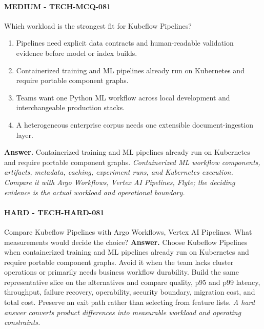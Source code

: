 \paragraph{MEDIUM - TECH-MCQ-081} Which workload is the strongest fit for Kubeflow Pipelines?
\begin{enumerate}[label=\Alph*.]
\item Pipelines need explicit data contracts and human-readable validation evidence before model or index builds.
\item Containerized training and ML pipelines already run on Kubernetes and require portable component graphs.
\item Teams want one Python ML workflow across local development and interchangeable production stacks.
\item A heterogeneous enterprise corpus needs one extensible document-ingestion layer.
\end{enumerate}
\textbf{Answer.} Containerized training and ML pipelines already run on Kubernetes and require portable component graphs.
\textit{Containerized ML workflow components, artifacts, metadata, caching, experiment runs, and Kubernetes execution. Compare it with Argo Workflows, Vertex AI Pipelines, Flyte; the deciding evidence is the actual workload and operational boundary.}
\paragraph{HARD - TECH-HARD-081} Compare Kubeflow Pipelines with Argo Workflows, Vertex AI Pipelines. What measurements would decide the choice?
\textbf{Answer.} Choose Kubeflow Pipelines when containerized training and ML pipelines already run on Kubernetes and require portable component graphs. Avoid it when the team lacks cluster operations or primarily needs business workflow durability. Build the same representative slice on the alternatives and compare quality, p95 and p99 latency, throughput, failure recovery, operability, security boundary, migration cost, and total cost. Preserve an exit path rather than selecting from feature lists.
\textit{A hard answer converts product differences into measurable workload and operating constraints.}
